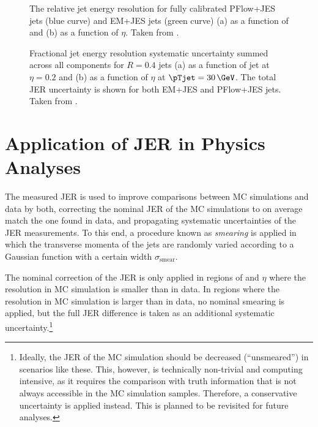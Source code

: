 \begin{figure}
    \caption{The relative jet energy resolution for fully calibrated PFlow+JES jets (blue curve) and EM+JES jets (green curve) (a) as a function of \pTjet and (b) as a function of $\eta$. Taken from .}
    \label{fig:jer-combination-results}
\end{figure}



\FloatBarrier
\begin{figure}[t]
    \caption{Fractional jet energy resolution systematic uncertainty summed across all components for \antikt $R = 0.4$ jets (a) as a function of jet \pTjet at $\eta = 0.2$ and (b) as a function of $\eta$ at $\pTjet = 30\,\GeV$. The total JER uncertainty is shown for both EM+JES and PFlow+JES jets. Taken from .}
    \label{fig:jer-combination-uncertainties}
\end{figure}



\section{Application of JER in Physics Analyses}
The measured JER is used to improve comparisons between MC simulations and data by both, correcting the nominal JER of the MC simulations to on average match the one found in data, and propagating systematic uncertainties of the JER measurements. 
To this end, a procedure known as \emph{smearing} is applied in which the transverse momenta of the jets are randomly varied according to a Gaussian function with a certain width $\sigma_{\text{smear}}$. 

The nominal correction of the JER is only applied in regions of \pT and $\eta$ where the resolution in MC simulation is smaller than in data. In regions where the resolution in MC simulation is larger than in data, no nominal smearing is applied, but the full JER difference is taken as an additional systematic uncertainty.\footnote{Ideally, the JER of the MC simulation should be decreased (``unsmeared'') in scenarios like these. This, however, is technically non-trivial and computing intensive, as it requires the comparison with truth information that is not always accessible in the MC simulation samples. Therefore, a conservative uncertainty is applied instead. This is planned to be revisited for future analyses.}


